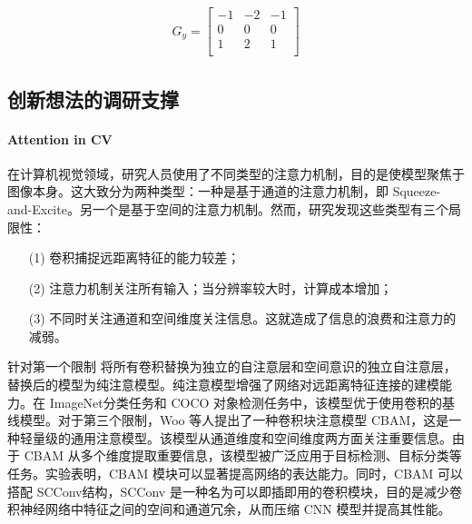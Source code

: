 \documentclass[a4paper, 10pt]{article}
\begin{document}
		\begin{equation*}
			\begin{aligned}
				G_y = 
				\begin{bmatrix}
					-1 & -2 & -1 \\
					0 & 0 & 0 \\
					1 & 2 & 1 \\
				\end{bmatrix}
			\end{aligned}
			\label{eq: Sobel_y}
		\end{equation*}
				
		\subsection{创新想法的调研支撑}
		
		\paragraph{Attention in CV}
		
		在计算机视觉领域，研究人员使用了不同类型的注意力机制，目的是使模型聚焦于图像本身。这大致分为两种类型：一种是基于通道的注意力机制，即 Squeeze-and-Excite。另一个是基于空间的注意力机制\cite{woo2018cbam}。然而，研究发现这些类型有三个局限性：
		
		\begin{itemize}
			\item[(1)] 
			卷积捕捉远距离特征的能力较差；
			
			\item[(2)]
			注意力机制关注所有输入；当分辨率较大时，计算成本增加；
			
			\item[(3)]
			不同时关注通道和空间维度关注信息。这就造成了信息的浪费和注意力的减弱。
		\end{itemize}	
		
		针对第一个限制 \cite{ramachandran2019stand} 将所有卷积替换为独立的自注意层和空间意识的独立自注意层，替换后的模型为纯注意模型。纯注意模型增强了网络对远距离特征连接的建模能力。在 ImageNet分类任务和 COCO 对象检测任务中，该模型优于使用卷积的基线模型。对于第三个限制，Woo 等人\cite{woo2018cbam}提出了一种卷积块注意模型 CBAM，这是一种轻量级的通用注意模型。该模型从通道维度和空间维度两方面关注重要信息。由于 CBAM 从多个维度提取重要信息，该模型被广泛应用于目标检测、目标分类等任务。实验表明，CBAM 模块可以显著提高网络的表达能力。同时，CBAM 可以搭配 SCConv\cite{li2023scconv}结构，SCConv 是一种名为可以即插即用的卷积模块，目的是减少卷积神经网络中特征之间的空间和通道冗余，从而压缩 CNN 模型并提高其性能。
		
\end{document}
